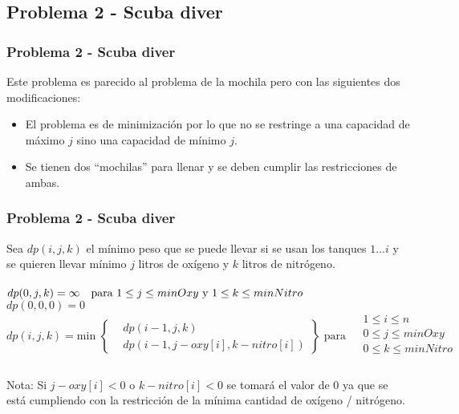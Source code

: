 \documentclass{beamer}
\begin{document}
	\subsection{Problema 2 - Scuba diver}
	\begin{frame}
		\frametitle{Problema 2 - Scuba diver}
		Este problema es parecido al problema de la mochila pero con las siguientes dos modificaciones:
		\begin{itemize}
			\item El problema es de minimización por lo que no se restringe a una capacidad de máximo $j$ sino una capacidad de mínimo $j$.
			\item Se tienen dos ``mochilas'' para llenar y se deben cumplir las restricciones de ambas.
		\end{itemize}		
	\end{frame}
	
	\begin{frame}
		\frametitle{Problema 2 - Scuba diver}
		Sea $dp(i, j, k)$ el mínimo peso que se puede llevar si se usan los tanques $1 \ldots i$ y se quieren llevar mínimo $j$ litros de oxígeno y $k$ litros de nitrógeno.\\ \quad \\
		$dp(0, j, k) = \infty \text{\quad para } 1 \leq j \leq minOxy \text{ y } 1 \leq k \leq minNitro$ \\
		$dp(0, 0, 0) = 0$\\
		$dp(i, j, k) =  \text{min } 
		\left\{
			\begin{aligned}
				& dp(i - 1, j, k)  \\
			 	& dp(i - 1, j - oxy[i], k - nitro[i] )
			\end{aligned}
		\right\}
		\text{ para } 
			\begin{aligned}
				& 1 \leq i \leq n\\
				& 0 \leq j \leq minOxy\\
				& 0 \leq k \leq minNitro\\
			\end{aligned}
		$\\ \quad \\
		Nota: Si $j - oxy[i] < 0$ o $k - nitro[i] < 0$ se tomará el valor de 0 ya que se está cumpliendo con la restricción de la mínima cantidad de oxígeno / nitrógeno.
	\end{frame}
	
\end{document}
